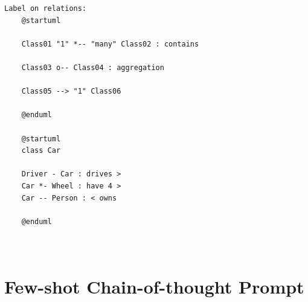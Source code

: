\begin{lstlisting}[caption={Few-shot prompt}, label={lst:Few_shot},basicstyle=\ttfamily\tiny]
Label on relations:
    @startuml

    Class01 "1" *-- "many" Class02 : contains

    Class03 o-- Class04 : aggregation

    Class05 --> "1" Class06

    @enduml

    @startuml
    class Car

    Driver - Car : drives >
    Car *- Wheel : have 4 >
    Car -- Person : < owns

    @enduml



\end{lstlisting}

\section{Few-shot Chain-of-thought  Prompt}
